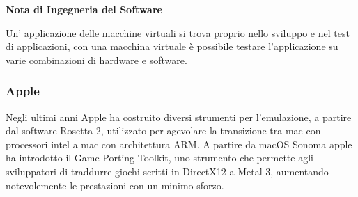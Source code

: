 \begin{note}
    \textbf{Nota di Ingegneria del Software}

    Un' applicazione delle macchine virtuali si trova proprio nello sviluppo e nel test di applicazioni, con una macchina virtuale è possibile testare l'applicazione su varie combinazioni di hardware e software.
\end{note}

\subsubsection*{Apple}
Negli ultimi anni Apple ha costruito diversi strumenti per l'emulazione, a partire dal software Rosetta 2, utilizzato per agevolare la transizione tra mac con processori intel a mac con architettura ARM.
A partire da macOS Sonoma apple ha introdotto il Game Porting Toolkit, uno strumento che permette agli sviluppatori di traddurre giochi scritti in DirectX12 a Metal 3, aumentando notevolemente le prestazioni con un minimo sforzo.
